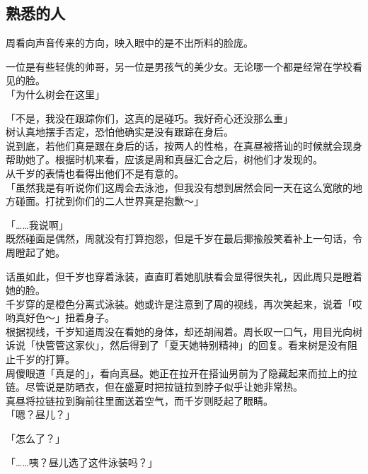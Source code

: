 \subsection{熟悉的人}

周看向声音传来的方向，映入眼中的是不出所料的脸庞。

一位是有些轻佻的帅哥，另一位是男孩气的美少女。无论哪一个都是经常在学校看见的脸。\\

「为什么树会在这里」

「不是，我没在跟踪你们，这真的是碰巧。我好奇心还没那么重」\\

树认真地摆手否定，恐怕他确实是没有跟踪在身后。\\

说到底，若他们真是跟在身后的话，按两人的性格，在真昼被搭讪的时候就会现身帮助她了。根据时机来看，应该是周和真昼汇合之后，树他们才发现的。\\

从千岁的表情也看得出他们不是有意的。\\

「虽然我是有听说你们这周会去泳池，但我没有想到居然会同一天在这么宽敞的地方碰面。打扰到你们的二人世界真是抱歉～」

「……我说啊」\\

既然碰面是偶然，周就没有打算抱怨，但是千岁在最后揶揄般笑着补上一句话，令周瞪起了她。

话虽如此，但千岁也穿着泳装，直直盯着她肌肤看会显得很失礼，因此周只是瞪着她的脸。\\

千岁穿的是橙色分离式泳装。她或许是注意到了周的视线，再次笑起来，说着「哎哟真好色～」扭着身子。\\

根据视线，千岁知道周没在看她的身体，却还胡闹着。周长叹一口气，用目光向树诉说「快管管这家伙」，然后得到了「夏天她特别精神」的回复。看来树是没有阻止千岁的打算。\\

周傻眼道「真是的」，看向真昼。她正在拉开在搭讪男前为了隐藏起来而拉上的拉链。尽管说是防晒衣，但在盛夏时把拉链拉到脖子似乎让她非常热。\\

真昼将拉链拉到胸前往里面送着空气，而千岁则眨起了眼睛。\\

「嗯？昼儿？」

「怎么了？」

「……咦？昼儿选了这件泳装吗？」

